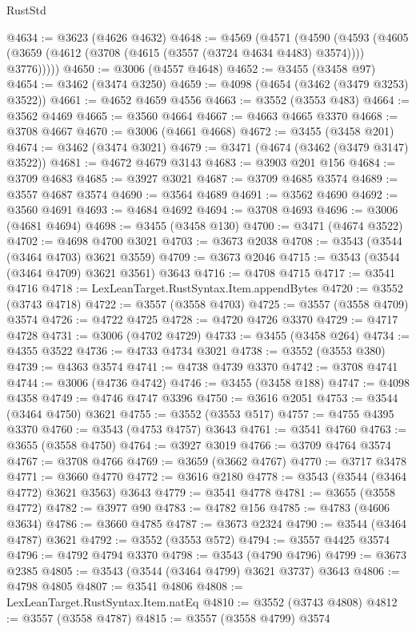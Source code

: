 \begin{lexlean}{RustStd}
\begin{coremodule}
@4634 := @3623 (@4626 @4632)
@4648 := @4569
    (@4571
      (@4590
        (@4593 (@4605 (@3659 (@4612 (@3708 (@4615 (@3557 (@3724 @4634 @4483) @3574)))) @3776)))))
@4650 := @3006 (@4557 @4648)
@4652 := @3455 (@3458 @97)
@4654 := @3462 (@3474 @3250)
@4659 := @4098 (@4654 (@3462 (@3479 @3253) @3522))
@4661 := @4652 @4659 @4556
@4663 := @3552 (@3553 @483)
@4664 := @3562 @4469
@4665 := @3560 @4664
@4667 := @4663 @4665 @3370
@4668 := @3708 @4667
@4670 := @3006 (@4661 @4668)
@4672 := @3455 (@3458 @201)
@4674 := @3462 (@3474 @3021)
@4679 := @3471 (@4674 (@3462 (@3479 @3147) @3522))
@4681 := @4672 @4679 @3143
@4683 := @3903 @201 @156
@4684 := @3709 @4683
@4685 := @3927 @3021
@4687 := @3709 @4685 @3574
@4689 := @3557 @4687 @3574
@4690 := @3564 @4689
@4691 := @3562 @4690
@4692 := @3560 @4691
@4693 := @4684 @4692
@4694 := @3708 @4693
@4696 := @3006 (@4681 @4694)
@4698 := @3455 (@3458 @130)
@4700 := @3471 (@4674 @3522)
@4702 := @4698 @4700 @3021
@4703 := @3673 @2038
@4708 := @3543 (@3544 (@3464 @4703) @3621 @3559)
@4709 := @3673 @2046
@4715 := @3543 (@3544 (@3464 @4709) @3621 @3561) @3643
@4716 := @4708 @4715
@4717 := @3541 @4716
@4718 := LexLeanTarget.RustSyntax.Item.appendBytes
@4720 := @3552 (@3743 @4718)
@4722 := @3557 (@3558 @4703)
@4725 := @3557 (@3558 @4709) @3574
@4726 := @4722 @4725
@4728 := @4720 @4726 @3370
@4729 := @4717 @4728
@4731 := @3006 (@4702 @4729)
@4733 := @3455 (@3458 @264)
@4734 := @4355 @3522
@4736 := @4733 @4734 @3021
@4738 := @3552 (@3553 @380)
@4739 := @4363 @3574
@4741 := @4738 @4739 @3370
@4742 := @3708 @4741
@4744 := @3006 (@4736 @4742)
@4746 := @3455 (@3458 @188)
@4747 := @4098 @4358
@4749 := @4746 @4747 @3396
@4750 := @3616 @2051
@4753 := @3544 (@3464 @4750) @3621
@4755 := @3552 (@3553 @517)
@4757 := @4755 @4395 @3370
@4760 := @3543 (@4753 @4757) @3643
@4761 := @3541 @4760
@4763 := @3655 (@3558 @4750)
@4764 := @3927 @3019
@4766 := @3709 @4764 @3574
@4767 := @3708 @4766
@4769 := @3659 (@3662 @4767)
@4770 := @3717 @3478
@4771 := @3660 @4770
@4772 := @3616 @2180
@4778 := @3543 (@3544 (@3464 @4772) @3621 @3563) @3643
@4779 := @3541 @4778
@4781 := @3655 (@3558 @4772)
@4782 := @3977 @90
@4783 := @4782 @156
@4785 := @4783 (@4606 @3634)
@4786 := @3660 @4785
@4787 := @3673 @2324
@4790 := @3544 (@3464 @4787) @3621
@4792 := @3552 (@3553 @572)
@4794 := @3557 @4425 @3574
@4796 := @4792 @4794 @3370
@4798 := @3543 (@4790 @4796)
@4799 := @3673 @2385
@4805 := @3543 (@3544 (@3464 @4799) @3621 @3737) @3643
@4806 := @4798 @4805
@4807 := @3541 @4806
@4808 := LexLeanTarget.RustSyntax.Item.natEq
@4810 := @3552 (@3743 @4808)
@4812 := @3557 (@3558 @4787)
@4815 := @3557 (@3558 @4799) @3574

\end{coremodule}
\end{lexlean}
